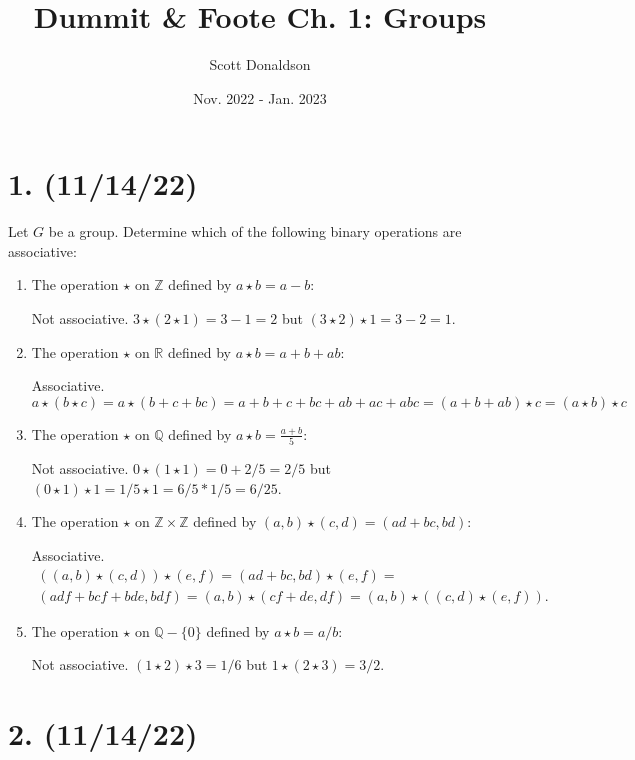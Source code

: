 \documentclass{article}
\title{Dummit \& Foote Ch. 1: Groups}
\author{Scott Donaldson}
\date{Nov. 2022 - Jan. 2023}
\begin{document}
\maketitle

\section*{1. (11/14/22)}

Let $G$ be a group. Determine which of the following binary operations are associative:

\begin{enumerate}[label=(\alph*)]
    \item The operation $\star$ on $\mathbb{Z}$ defined by $a \star b = a - b:$
    
          Not associative. $3 \star (2 \star 1) = 3 - 1 = 2$ but $(3 \star 2) \star 1 = 3 - 2 = 1$.
    \item The operation $\star$ on $\mathbb{R}$ defined by $a \star b = a + b + ab:$
    
          Associative. 
          \begin{equation*}
            a \star (b \star c) = a \star (b + c + bc) = a + b + c + bc + ab + ac + abc =
            (a + b + ab) \star c = (a \star b) \star c
          \end{equation*}
    \item The operation $\star$ on $\mathbb{Q}$ defined by $a \star b = \frac{a + b}{5}$:
    
          Not associative. $0 \star (1 \star 1) = 0 + 2/5 = 2/5$ but $(0 \star 1) \star 1 = 1/5 \star 1 = 6/5 * 1/5 = 6/25$.
    \item The operation $\star$ on $\mathbb{Z} \times \mathbb{Z}$ defined by $(a, b) \star (c, d) = (ad + bc, bd):$
    
          Associative.
          \begin{multline*}
            ((a,b)\star(c,d))\star(e,f) = (ad + bc, bd)\star(e,f) = \\
            (adf + bcf + bde, bdf) = (a,b)\star(cf + de, df) = (a,b)\star((c,d)\star(e,f)).
          \end{multline*}
    \item The operation $\star$ on $\mathbb{Q} - \{0\}$ defined by $a \star b = a / b:$
    
          Not associative. $(1 \star 2) \star 3 = 1/6$ but $1 \star (2 \star 3) = 3/2$.
\end{enumerate}

\section*{2. (11/14/22)}
\end{document}
